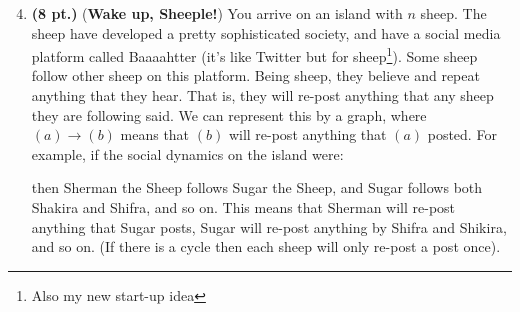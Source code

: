 \documentclass{article}
\newcommand{\pts}[1]{\textbf{(#1 pt.)}}
\begin{document}
\begin{enumerate}
\setcounter{enumi}{3}

\item\pts{8} (\textbf{Wake up, Sheeple!}) You arrive on an island with $n$ sheep.  The sheep have developed a pretty sophisticated society, and have a social media platform called Baaaahtter (it's like Twitter but for sheep\footnote{Also my new start-up idea}).  Some sheep follow other sheep on this platform.  Being sheep, they believe and repeat anything that they hear.  That is, they will re-post anything that any sheep they are following said.  
We can represent this by a graph, where $(a) \to (b)$ means that $(b)$ will re-post anything that $(a)$ posted.  For example, if the social dynamics on the island were:
\begin{center}
\end{center}
then Sherman the Sheep follows Sugar the Sheep, and Sugar follows both Shakira and Shifra, and so on.
This means that Sherman will re-post anything that Sugar posts, Sugar will re-post anything by Shifra and Shikira, and so on.
(If there is a cycle then each sheep will only re-post a post once).


\end{enumerate}
\end{document}
